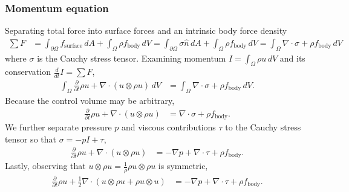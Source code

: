 \documentclass[letterpaper,11pt,nointlimits,reqno]{amsart}
\begin{document}
\subsubsection{Momentum equation} 
Separating total force into surface forces and an intrinsic body force
density
\begin{align}
  \sum{}F
  &= 
     \int_{\partial\Omega} f_\text{surface} \, dA 
   + \int_{\Omega} \rho{}f_\text{body} \, dV 
  = 
     \int_{\partial\Omega} \sigma \hat{n} \, dA 
  +  \int_{\Omega} \rho{}f_\text{body} \, dV 
  =  \int_{\Omega} \nabla\cdot\sigma + \rho{} f_\text{body} \, dV 
\end{align}
where $\sigma$ is the Cauchy stress tensor.  Examining
momentum $I=\int_{\Omega} \rho{}u\,dV$ and its conservation
$\frac{d}{dt}I=\sum{}F$,
\begin{align}
    \int_{\Omega}\frac{\partial{}}{\partial{}t}\rho{}u
  + \nabla\cdot(u\otimes{}\rho{}u)\,dV
&= \int_{\Omega} \nabla\cdot\sigma + \rho{} f_\text{body} \, dV 
.
\end{align}
Because the control volume may be arbitrary, 
\begin{align}
  \frac{\partial{}}{\partial{}t}\rho{}u + \nabla\cdot(u\otimes{}\rho{}u) 
&= \nabla\cdot\sigma + \rho{} f_\text{body}
.
\end{align}
We further separate pressure $p$ and viscous contributions $\tau$ to
the Cauchy stress tensor so that $\sigma = -p I + \tau$,
\begin{align}
\frac{\partial{}}{\partial{}t}\rho{}u + \nabla\cdot(u\otimes{}\rho{}u) 
&= -\nabla{}p + \nabla\cdot{}\tau + \rho{} f_\text{body}
.
\end{align}
Lastly, observing that $u\otimes\rho{}u = \frac{1}{\rho}\rho{}u\otimes\rho{}u$
is symmetric,
\begin{align}
\label{eq:cons_momentum}
\frac{\partial{}}{\partial{}t}\rho{}u 
+ \frac{1}{2}\nabla\cdot(u\otimes{}\rho{}u + \rho{}u\otimes{}u) 
&= -\nabla{}p + \nabla\cdot{}\tau + \rho{} f_\text{body}
.
\end{align}
\end{document}
